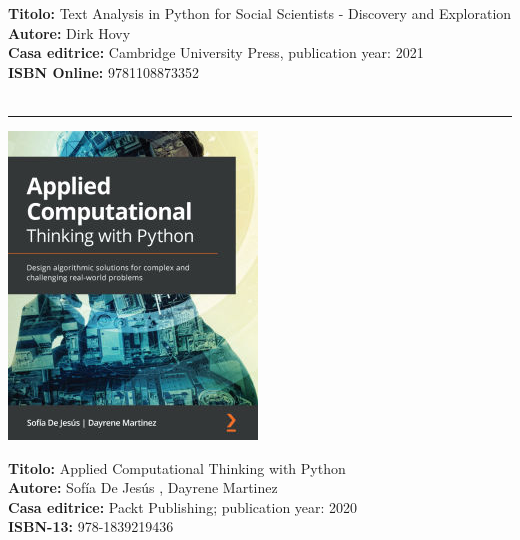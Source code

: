 \documentclass[11pt, a4paper]{article}
\begin{document}
\begin{minipage}[b]{0.75\linewidth}          
	\noindent \textbf{Titolo:} Text Analysis in Python for Social Scientists - Discovery and Exploration \\
	\textbf{Autore:} Dirk Hovy \\
	\textbf{Casa editrice:} Cambridge University Press, publication year: 2021  \\
	\textbf{ISBN Online:} 9781108873352\\   
	\vspace{1cm}
	~
\end{minipage}
\vspace{.18cm}
\hrule
\vspace{.4cm}
\begin{minipage}[b]{0.17\linewidth}          
	\includegraphics[width=.95\linewidth]{Sillabo/images/AppliedComputationalThinkingWithPython.jpeg}
\end{minipage}\hfill
\begin{minipage}[b]{0.75\linewidth}          
	\noindent \textbf{Titolo:} Applied Computational Thinking with Python \\
	\textbf{Autore:} Sof\'{i}a De Jes\'{u}s , Dayrene Martinez \\
	\textbf{Casa editrice:} Packt Publishing; publication year: 2020  \\
	\textbf{ISBN-13:} 978-1839219436\\  
	\vspace{1cm}
	~
\end{minipage}
\end{document}
